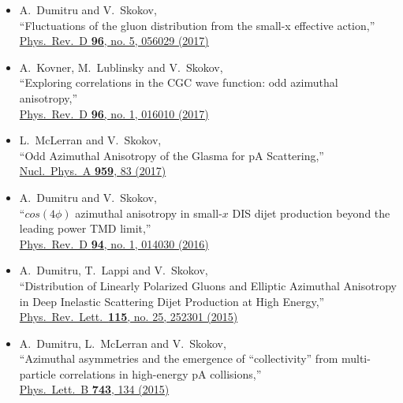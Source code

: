 \begin{itemize}
  \item[] 
	  A.~Dumitru and V.~Skokov,\\
  ``Fluctuations of the gluon distribution from the small-x effective action,''\\
   \href{http://dx.doi.org/doi:10.1103/PhysRevD.96.056029}{
  Phys.\ Rev.\ D {\bf 96}, no. 5, 056029 (2017)
}

  \item[]
	   A.~Kovner, M.~Lublinsky and V.~Skokov,\\
  ``Exploring correlations in the CGC wave function: odd azimuthal anisotropy,''\\
   \href{http://dx.doi.org/doi:10.1103/PhysRevD.96.016010}{
  Phys.\ Rev.\ D {\bf 96}, no. 1, 016010 (2017)
}

  \item[]
	    L.~McLerran and V.~Skokov,\\
  ``Odd Azimuthal Anisotropy of the Glasma for pA Scattering,''\\
   \href{http://dx.doi.org/doi:10.1016/j.nuclphysa.2016.12.011}{
Nucl.\ Phys.\ A {\bf 959}, 83 (2017)
}
  \item[]
	    A.~Dumitru and V.~Skokov,\\
  ``$cos(4 \phi )$ azimuthal anisotropy in small-$x$ DIS dijet production beyond the leading power TMD limit,''\\
   \href{http://dx.doi.org/doi:10.1103/PhysRevD.94.014030}{
  Phys.\ Rev.\ D {\bf 94}, no. 1, 014030 (2016)
}

	\item[]
    A.~Dumitru, T.~Lappi and V.~Skokov,\\
  ``Distribution of Linearly Polarized Gluons and Elliptic Azimuthal Anisotropy in Deep Inelastic Scattering Dijet Production at High Energy,''\\
  \href{http://dx.doi.org/doi:10.1103/PhysRevLett.115.252301}{
  Phys.\ Rev.\ Lett.\  {\bf 115}, no. 25, 252301 (2015)
  }

  \item[]
	    A.~Dumitru, L.~McLerran and V.~Skokov, \\ 
		``Azimuthal asymmetries and the emergence of “collectivity” from multi-particle correlations in high-energy pA collisions,''\\
		\href{http://dx.doi.org/doi:10.1016/j.physletb.2015.02.046}{
			Phys.\ Lett.\ B {\bf 743}, 134 (2015)}
\end{itemize}




